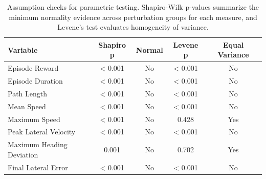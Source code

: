 \begin{table}[t]
\centering
\caption{Assumption checks for parametric testing. Shapiro-Wilk p-values summarize the minimum normality evidence across perturbation groups for each measure, and Levene's test evaluates homogeneity of variance.}
\label{tab:assumption_tests}
\begin{tabular}{lcccc}
\hline
Variable & Shapiro p & Normal & Levene p & Equal Variance \\
\hline
Episode Reward & < 0.001 & No & < 0.001 & No \\
Episode Duration & < 0.001 & No & < 0.001 & No \\
Path Length & < 0.001 & No & < 0.001 & No \\
Mean Speed & < 0.001 & No & < 0.001 & No \\
Maximum Speed & < 0.001 & No & 0.428 & Yes \\
Peak Lateral Velocity & < 0.001 & No & < 0.001 & No \\
Maximum Heading Deviation & 0.001 & No & 0.702 & Yes \\
Final Lateral Error & < 0.001 & No & < 0.001 & No \\
\hline
\end{tabular}
\end{table}

